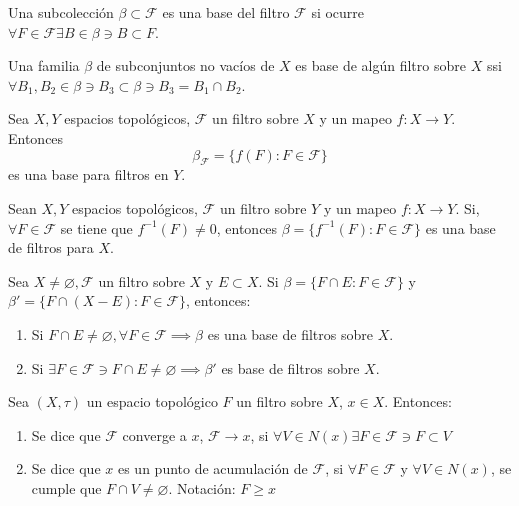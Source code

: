 \documentclass[a4paper, 12pt]{article}
\begin{document}
\begin{definicion}
    Una subcolección $\beta\subset \mathcal{F}$ es una base del filtro $\mathcal{F}$ si ocurre $\forall F\in \mathcal{F}\exists B\in \beta\ni B\subset F$.
\end{definicion}

\begin{teorema}
    Una familia $\beta$ de subconjuntos no vacíos de $X$ es base de algún filtro sobre $X$ ssi $\forall B_1,B_2\in \beta \ni B_3 \subset \beta \ni B_3 = B_1\cap B_2$.
\end{teorema}




 \begin{teorema}
    Sea $X,Y$ espacios topológicos, $\mathcal{F}$ un filtro sobre $X$ y un mapeo $f:X\to Y$. Entonces 
    $$\beta_{\mathcal{F}}=\{f(F):F\in \mathcal{F}\}$$
    es una base para filtros en $Y$. 
 \end{teorema}

 \begin{teorema}
    Sean $X,Y$ espacios topológicos, $\mathcal{F}$ un filtro sobre $Y$ y un mapeo $f:X\to Y$. Si, $\forall F\in \mathcal{F}$ se tiene que $f^{-1}(F)\neq 0$, entonces $\beta=\{f^{-1}(F):F\in \mathcal{F}\}$ es una base de filtros para $X$. 

 \end{teorema}

 \begin{teorema}
    Sea $X\neq \varnothing, \mathcal{F}$ un filtro sobre $X$ y $E\subset X$. Si $\beta=\{F\cap E: F\in \mathcal{F}\}$ y $\beta' =\{F\cap (X-E):F\in \mathcal{F}\}$, entonces: 
    \begin{enumerate}
        \item Si $F\cap E\neq \varnothing,\forall F\in \mathcal{F}\implies \beta$ es una base de filtros sobre $X$. 

        \item Si $\exists F\in \mathcal{F}\ni F\cap E\neq \varnothing \implies \beta '$ es base de filtros sobre $X$. 

    \end{enumerate}
 \end{teorema}

 \begin{definicion}
    Sea $(X,\tau)$ un espacio topológico $F$ un filtro sobre $X$, $x\in X$. Entonces: 
    \begin{enumerate}
        \item Se dice que $\mathcal{F}$ converge a $x$, $\mathcal{F}\to x$, si $\forall V\in N(x)\exists F\in \mathcal{F}\ni F\subset V$
        \item Se dice que $x$ es un punto de acumulación de $\mathcal{F}$, si $\forall F\in \mathcal{F}$ y $\forall V \in N(x)$, se cumple que $F\cap V\neq \varnothing$. Notación: $F\geq x$
    \end{enumerate}
 \end{definicion}
\end{document}
